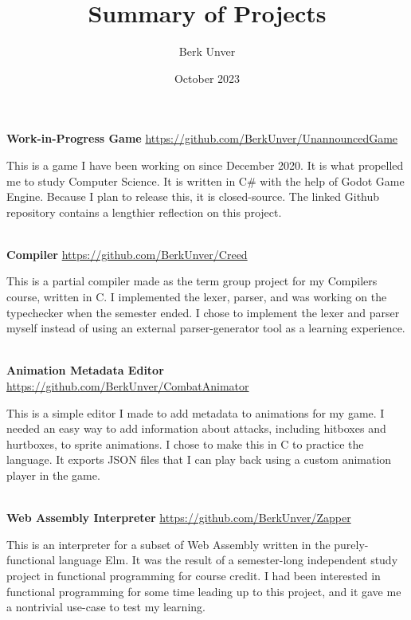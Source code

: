\documentclass{article}
\title{Summary of Projects}
\author{Berk Unver}
\date{October 2023}
\newcommand{\header}[2]{
    \par\noindent\Large\textbf{#1}\normalsize\newline
    \url{#2}\newline
}
\begin{document}
\maketitle

\header{Work-in-Progress Game}{https://github.com/BerkUnver/UnannouncedGame}
This is a game I have been working on since December 2020. It is what propelled me to study Computer Science. It is written in C\# with the help of Godot Game Engine. Because I plan to release this, it is closed-source. The linked Github repository contains a lengthier reflection on this project.
\\\\

\header{Compiler}{https://github.com/BerkUnver/Creed}
This is a partial compiler made as the term group project for my Compilers course, written in C. I implemented the lexer, parser, and was working on the typechecker when the semester ended. I chose to implement the lexer and parser myself instead of using an external parser-generator tool as a learning experience.
\\\\

\header{Animation Metadata Editor}{https://github.com/BerkUnver/CombatAnimator}
This is a simple editor I made to add metadata to animations for my game. I needed an easy way to add information about attacks, including hitboxes and hurtboxes, to sprite animations. I chose to make this in C to practice the language. It exports JSON files that I can play back using a custom animation player in the game.
\\\\

\header{Web Assembly Interpreter}{https://github.com/BerkUnver/Zapper}
This is an interpreter for a subset of Web Assembly written in the purely-functional language Elm. It was the result of a semester-long independent study project in functional programming for course credit. I had been interested in functional programming for some time leading up to this project, and it gave me a nontrivial use-case to test my learning.
\end{document}
